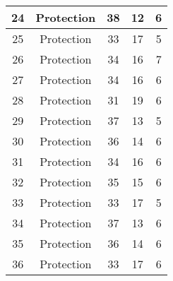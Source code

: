 \documentclass[results.tex]{subfiles}
\begin{document}
\begin{center}
\begin{tabular}{| c || c | c | c | c |}
            \hline
            24                      & Protection                   & 38                     & 12                      & 6                    \\
            \hline
            25                      & Protection                   & 33                     & 17                      & 5                    \\
            \hline
            26                      & Protection                   & 34                     & 16                      & 7                    \\
            \hline
            27                      & Protection                   & 34                     & 16                      & 6                    \\
            \hline
            28                      & Protection                   & 31                     & 19                      & 6                    \\
            \hline
            29                      & Protection                   & 37                     & 13                      & 5                    \\
            \hline
            30                      & Protection                   & 36                     & 14                      & 6                    \\
            \hline
            31                      & Protection                   & 34                     & 16                      & 6                    \\
            \hline
            32                      & Protection                   & 35                     & 15                      & 6                    \\
            \hline
            33                      & Protection                   & 33                     & 17                      & 5                    \\
            \hline
            34                      & Protection                   & 37                     & 13                      & 6                    \\
            \hline
            35                      & Protection                   & 36                     & 14                      & 6                    \\
            \hline
            36                      & Protection                   & 33                     & 17                      & 6                    \\

\end{tabular}
\end{center}
\end{document}
